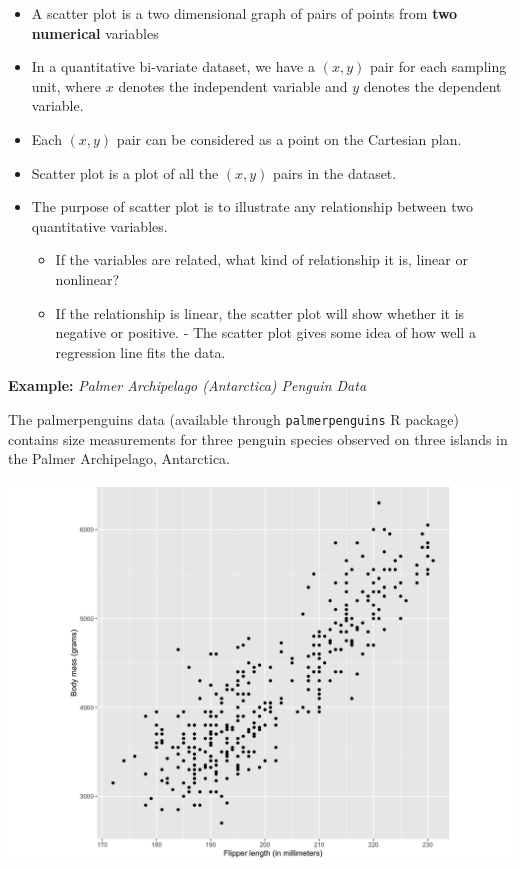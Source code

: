 \documentclass[]{book}
\providecommand{\tightlist}{%
  \setlength{\itemsep}{0pt}\setlength{\parskip}{0pt}}
\begin{document}
\begin{itemize}
\tightlist
\item
  A scatter plot is a two dimensional graph of pairs of points from \textbf{two numerical} variables
\item
  In a quantitative bi-variate dataset, we have a \((x,y)\) pair for each sampling unit, where \(x\) denotes the independent variable and \(y\) denotes the dependent variable.
\item
  Each \((x,y)\) pair can be considered as a point on the Cartesian plan.
\item
  Scatter plot is a plot of all the \((x,y)\) pairs in the dataset.
\item
  The purpose of scatter plot is to illustrate any relationship between two quantitative variables.

  \begin{itemize}
  \tightlist
  \item
    If the variables are related, what kind of relationship it is, linear or nonlinear?
  \item
    If the relationship is linear, the scatter plot will show whether it is negative or positive. - The scatter plot gives some idea of how well a regression line fits the data.
  \end{itemize}
\end{itemize}

\textbf{Example:} \emph{Palmer Archipelago (Antarctica) Penguin Data}

The palmerpenguins data (available through \texttt{palmerpenguins} R package) contains size measurements for three penguin species observed on three islands in the Palmer Archipelago, Antarctica.

\begin{center}\includegraphics[width=0.8\linewidth]{figure/scatterplot10-1} \end{center}
\end{document}
